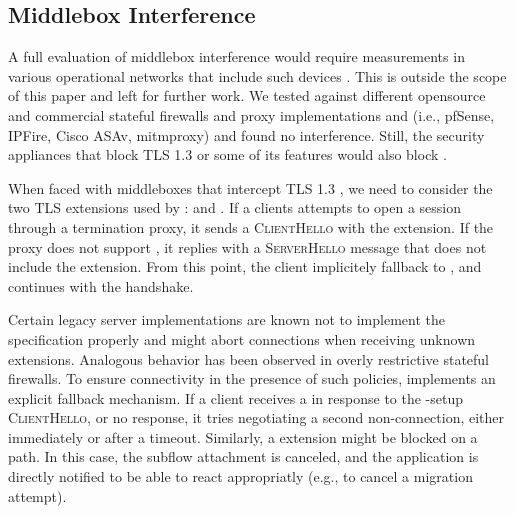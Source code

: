 \subsection{Middlebox Interference}

A full evaluation of middlebox interference would require measurements in various operational networks that include such devices \cite{honda2011still,raman2020measuring,o2016tls}. This is outside the scope of this paper and left for further work.
We tested \tcpls against different opensource and commercial stateful
firewalls and proxy implementations and (i.e., pfSense, IPFire, Cisco ASAv, mitmproxy) and found no interference. Still, the security appliances that block
TLS 1.3 or some of its features \cite{lee2019matls,Bock_China,raman2020measuring} would also block \tcpls.


When faced with middleboxes that intercept TLS 1.3 \cite{Bock_China,raman2020measuring}, we need to consider the two TLS extensions used by \tcpls: \tcpls and \join. If a clients attempts to open a \tcpls session through a \tls termination
proxy, it sends a \textsc{ClientHello} with the \tcpls extension.
If the proxy does not support \tcpls, it replies with a \textsc{ServerHello}
message that does not include the \tcpls extension. From this point, the client
implicitely fallback to \tls, and continues with the handshake.

Certain legacy \tls server implementations are known not to implement the \tls
specification properly and might abort connections when receiving unknown \tls
extensions. Analogous behavior has been observed in overly restrictive stateful
firewalls. To ensure connectivity in the presence of such policies, \tcpls
implements an explicit fallback mechanism. If a client receives a \tcp \rst in
response to the \tcpls-setup \textsc{ClientHello}, or no response, it
tries negotiating a second non-\tcpls \tls connection, either
immediately or after a timeout. Similarly, a \tcpls \join extension might be
blocked on a path. In this case, the subflow attachment is canceled, and
the application is directly notified to be able to react appropriatly (e.g.,
to cancel a migration attempt).




